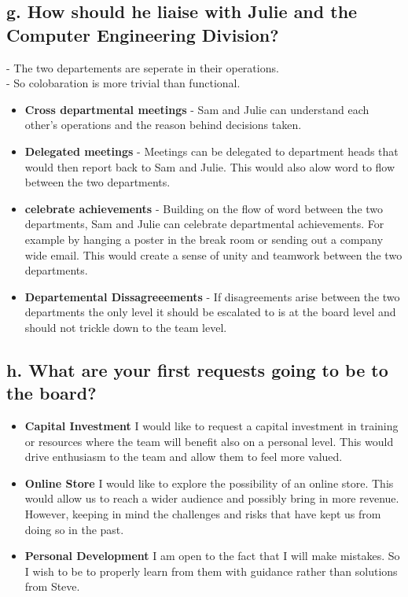 \documentclass{article}
\begin{document}
\subsection{g. How should he liaise with Julie and the Computer Engineering Division?}
- The two departements are seperate in their operations. \\
- So colobaration is more trivial than functional. \\

\begin{itemize}
    \item \textbf{Cross departmental meetings} - Sam and Julie can understand each other's operations and the reason behind decisions taken.
    \item \textbf{Delegated meetings} - Meetings can be delegated to department heads that would then report back to Sam and Julie. This would also alow word to flow between the two departments.
    \item \textbf{celebrate achievements} - Building on the flow of word between the two departments, Sam and Julie can celebrate departmental achievements. For example by hanging a poster in the break room or sending out a company wide email. This would create a sense of unity and teamwork between the two departments.
    \item \textbf{Departemental Dissagreeements} - If disagreements arise between the two departments the only level it should be escalated to is at the board level and should not trickle down to the team level.
\end{itemize}


\subsection{h. What are your first requests going to be to the board?}

\begin{itemize}
    \item \textbf{Capital Investment} I would like to request a capital investment in training or resources where the team will benefit also on a personal level. This would drive enthusiasm to the team and allow them to feel more valued. \\
    \item \textbf{Online Store} I would like to explore the possibility of an online store. This would allow us to reach a wider audience and possibly bring in more revenue. However, keeping in mind the challenges and risks that have kept us from doing so in the past. \\
    \item \textbf{Personal Development} I am open to the fact that I will make mistakes. So I wish to be to properly learn from them with guidance rather than solutions from Steve. \\
\end{itemize}
\end{document}
